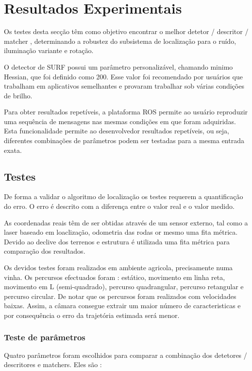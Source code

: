 \chapter{Resultados Experimentais} \label{chap:resexp}


Os testes desta secção têm como objetivo encontrar o melhor detetor / descritor / matcher , determinando a robustez do subsistema de localização para o ruído, iluminação variante e rotação.

O detector de SURF possui um parâmetro personalizável, chamando minimo Hessian, que foi definido como 200. Esse valor foi recomendado por usuários que trabalham em aplicativos semelhantes e provaram trabalhar sob várias condições de brilho.

Para obter resultados repetíveis, a plataforma ROS permite ao usuário reproduzir uma sequência de mensagens nas mesmas condições em que foram adquiridas. Esta funcionalidade permite ao desenvolvedor resultados repetíveis, ou seja, diferentes combinações de parâmetros podem ser testadas para a mesma entrada exata.

\section{Testes}

De forma a validar o algoritmo de localização os testes requerem a quantificação do erro. O erro é descrito com a diferença entre o valor real e o valor medido.

As coordenadas reais têm de ser obtidas através de um sensor externo, tal como a laser baseado em loaclização, odometria das rodas or mesmo uma fita métrica. Devido ao declive dos terrenos e estrutura é utilizada uma fita métrica para comparação dos resultados.

Os devidos testes foram realizados em ambiente agricola, precisamente numa vinha. Os percursos efectuados foram : estático, movimento em linha reta, movimento em L (semi-quadrado), percurso quadrangular, percurso retangular e percurso circular. De notar que os percursos foram realizados com velocidades baixas. Assim, a câmara consegue extrair um maior número de caracteristicas e por consequência o erro da trajetória estimada será menor.  


\subsection{Teste de parâmetros}

Quatro parâmetros foram escolhidos para comparar a combinação dos detetores / descritores e matchers. Eles são :

